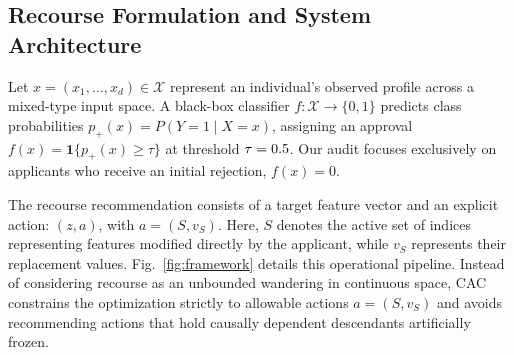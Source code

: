 \documentclass[nolineno]{paper/ieee-access/ieeeaccess}%
\newcommand{\CAC}{CAC}
\newcommand{\ind}{\ensuremath{\mathbf{1}}}
\begin{document}
\subsection{Recourse Formulation and System Architecture}
Let $x = (x_1, \dots, x_d) \in \mathcal{X}$ represent an individual's observed profile across a mixed-type input space. A black-box classifier $f: \mathcal{X} \to \{0, 1\}$ predicts class probabilities $p_+(x) = P(Y=1 \mid X=x)$, assigning an approval $f(x) = \ind\{p_+(x) \ge \tau\}$ at threshold $\tau = 0.5$. Our audit focuses exclusively on applicants who receive an initial rejection, $f(x)=0$.

The recourse recommendation consists of a target feature vector and an explicit action: $(z, a)$, with $a = (S, v_S)$. Here, $S$ denotes the active set of indices representing features modified directly by the applicant, while $v_S$ represents their replacement values. Fig.~\ref{fig:framework} details this operational pipeline. Instead of considering recourse as an unbounded wandering in continuous space, \CAC{} constrains the optimization strictly to allowable actions $a=(S, v_S)$ and avoids recommending actions that hold causally dependent descendants artificially frozen.
\end{document}
